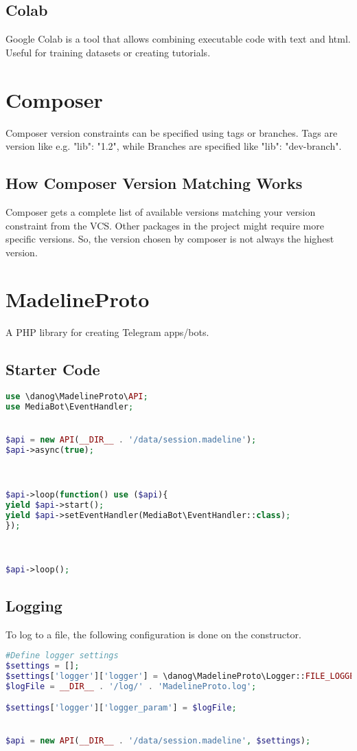 \documentclass{article}
\begin{document}
\subsection{Colab}
Google Colab is a tool that allows combining executable code with text and html. Useful for training datasets or creating tutorials.

\section{Composer}
Composer version constraints can be specified using tags or branches. Tags are version like e.g. "lib": "1.2", while Branches are specified like "lib": "dev-branch".
\subsection{How Composer Version Matching Works}
Composer gets a complete list of available versions matching your version constraint from the VCS. Other packages in the project might require more specific versions. So, the version chosen by composer is not always the highest version. 

\section{MadelineProto}
A PHP library for creating Telegram apps/bots.
\subsection{Starter Code}
\begin{lstlisting}[language=PHP]
use \danog\MadelineProto\API;
use MediaBot\EventHandler;


$api = new API(__DIR__ . '/data/session.madeline');
$api->async(true);



$api->loop(function() use ($api){
yield $api->start();    
yield $api->setEventHandler(MediaBot\EventHandler::class);
});



$api->loop();
\end{lstlisting}

\subsection{Logging}
To log to a file, the following configuration is done on the constructor. 
\begin{lstlisting}[language=PHP]
#Define logger settings
$settings = [];
$settings['logger']['logger'] = \danog\MadelineProto\Logger::FILE_LOGGER;
$logFile = __DIR__ . '/log/' . 'MadelineProto.log';

$settings['logger']['logger_param'] = $logFile;


$api = new API(__DIR__ . '/data/session.madeline', $settings);
\end{lstlisting}
\end{document}
